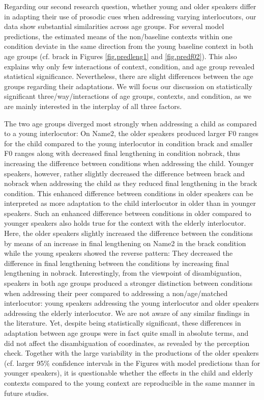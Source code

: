\documentclass[output=paper]{langscibook}
\begin{document}
Regarding our second research question, whether young and older speakers differ in adapting their use of prosodic cues when addressing varying interlocutors, our data show substantial similarities across age groups. For several model predictions, the estimated means of the non\-/baseline contexts within one condition deviate in the same direction from the young baseline context in both age groups (cf. brack in Figures \ref{fig.predleng1} and \ref{fig.predf02}). This also explains why only few interactions of context, condition, and age group revealed statistical significance. Nevertheless, there are slight differences between the age groups regarding their adaptations. We will focus our discussion on statistically significant three\-/way\-/interactions of age groups, contexts, and condition, as we are mainly interested in the interplay of all three factors. 

The two age groups diverged most strongly when addressing a child as compared to a young interlocutor: On Name2, the older speakers produced larger F0 ranges for the child compared to the young interlocutor in condition brack and smaller F0 ranges along with decreased final lengthening in condition nobrack, thus increasing the difference between conditions when addressing the child. Younger speakers, however, rather slightly decreased the difference between brack and nobrack when addressing the child as they reduced final lengthening in the brack condition. This enhanced difference between conditions in older speakers can be interpreted as more adaptation to the child interlocutor in older than in younger speakers. Such an enhanced difference between conditions in older compared to younger speakers also holds true for the context with the elderly interlocutor. Here, the older speakers slightly increased the difference between the conditions by means of an increase in final lengthening on Name2 in the brack condition while the young speakers showed the reverse pattern: They decreased the difference in final lengthening between the conditions by increasing final lengthening in nobrack. Interestingly, from the viewpoint of disambiguation, speakers in both age groups produced a stronger distinction between conditions when addressing their peer compared to addressing a non\-/age\-/matched interlocutor: young speakers addressing the young interlocutor and older speakers addressing the elderly interlocutor. We are not aware of any similar findings in the literature. Yet, despite being statistically significant, these differences in adaptation between age groups were in fact quite small in absolute terms, and did not affect the disambiguation of coordinates, as revealed by the perception check. Together with the large variability in the productions of the older speakers (cf. larger 95\% confidence intervals in the Figures with model predictions than for younger speakers), it is questionable whether the effects in the child and elderly contexts compared to the young context are reproducible in the same manner in future studies. 
\end{document}
